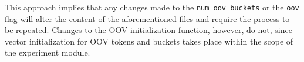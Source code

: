 \documentclass[../../fyp.tex]{subfiles}
\begin{document}
This approach implies that any changes made to the \texttt{num\_oov\_buckets} or the \texttt{oov} flag will alter the content of the aforementioned files and require the process to be repeated. Changes to the OOV initialization function, however, do not, since vector initialization for OOV tokens and buckets takes place within the scope of the experiment module.
\end{document}
